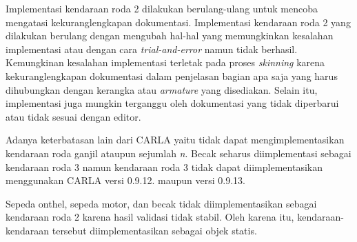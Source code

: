 Implementasi kendaraan roda 2 dilakukan berulang-ulang untuk mencoba mengatasi
kekuranglengkapan dokumentasi. Implementasi kendaraan roda 2 yang dilakukan
berulang dengan mengubah hal-hal yang memungkinkan kesalahan implementasi atau
dengan cara \textit{trial-and-error} namun tidak berhasil. Kemungkinan kesalahan
implementasi terletak pada proses \textit{skinning} karena kekuranglengkapan
dokumentasi dalam penjelasan bagian apa saja yang harus dihubungkan dengan
kerangka atau \textit{armature} yang disediakan. Selain itu, implementasi juga
mungkin terganggu oleh dokumentasi yang tidak diperbarui atau tidak sesuai
dengan editor.

Adanya keterbatasan lain dari CARLA yaitu tidak dapat mengimplementasikan
kendaraan roda ganjil ataupun sejumlah \textit{n}. Becak seharus diimplementasi
sebagai kendaraan roda 3 namun kendaraan roda 3 tidak dapat diimplementasikan
menggunakan CARLA versi 0.9.12. maupun versi 0.9.13.

Sepeda onthel, sepeda motor, dan becak tidak diimplementasikan sebagai kendaraan
roda 2 karena hasil validasi tidak stabil. Oleh karena itu, kendaraan-kendaraan
tersebut diimplementasikan sebagai objek statis.
